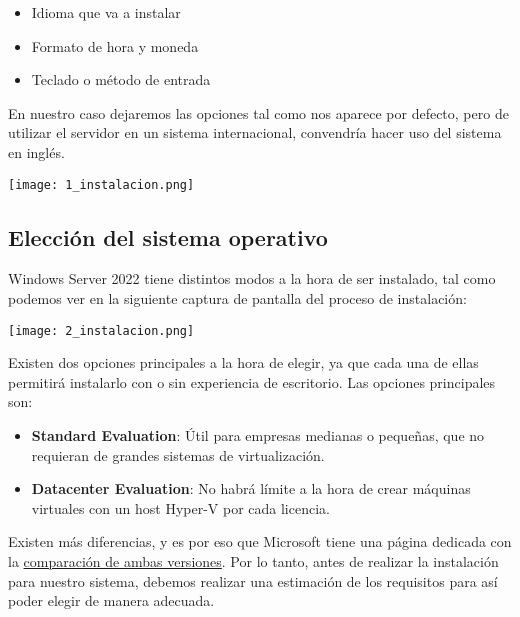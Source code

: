 {
    \begin{minipage}{0.6\linewidth}
        \setlength{\parskip}{1.2em}
        \begin{itemize}
            \item Idioma que va a instalar
            \item Formato de hora y moneda
            \item Teclado o método de entrada
        \end{itemize}

        En nuestro caso dejaremos las opciones tal como nos aparece por defecto, pero de utilizar el servidor en un sistema internacional, convendría hacer uso del sistema en inglés.
    \end{minipage}
    \hfill
    \begin{minipage}{0.36\linewidth}
            \vspace{-11pt}
            \texttt{[image: 1\_instalacion.png]}
    \end{minipage}
}

\subsection{Elección del sistema operativo}
Windows Server 2022 tiene distintos modos a la hora de ser instalado, tal como podemos ver en la siguiente captura de pantalla del proceso de instalación:
\begin{center}
    \vspace{-10pt}
    \texttt{[image: 2\_instalacion.png]}
    \vspace{-20pt}
\end{center}

Existen dos opciones principales a la hora de elegir, ya que cada una de ellas permitirá instalarlo con o sin experiencia de escritorio. Las opciones principales son:

\begin{itemize}
    \item \textbf{Standard Evaluation}: Útil para empresas medianas o pequeñas, que no requieran de grandes sistemas de virtualización.
    \item \textbf{Datacenter Evaluation}: No habrá límite a la hora de crear máquinas virtuales con un host Hyper-V por cada licencia.
\end{itemize}

Existen más diferencias, y es por eso que Microsoft tiene una página dedicada con la \href{https://docs.microsoft.com/es-es/windows-server/get-started/editions-comparison-windows-server-2022}{comparación de ambas versiones}. Por lo tanto, antes de realizar la instalación para nuestro sistema, debemos realizar una estimación de los requisitos para así poder elegir de manera adecuada.

